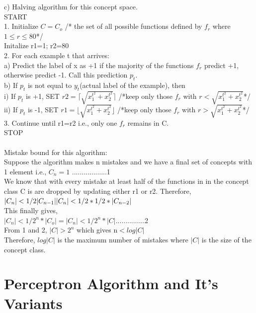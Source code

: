 \documentclass[12pt, fullpage,letterpaper]{article}
\begin{document}
c) Halving algorithm for this concept space.\\
START
\\1. Initialize $C=C_o$ /* the set of all possible functions defined by $f_r$ where $1\leq r\leq80$*/\\
Initalize r1=1; r2=80\\
2. For each  example t that arrives:\\
a) Predict the label of x as +1 if the majority of the functions $f_r$ predict +1, otherwise predict -1. Call this prediction $p_t$.\\
b) If $p_t$ is not equal to $y_t$(actual label of the example), then\\
i) If $p_t$ is +1, SET $r2=\lceil \sqrt{x_1^{t^2} + x_2^{t^2}} \rceil$    /*keep only those $f_r$ with $r<\sqrt{x_1^{t^2} + x_2^{t^2}}$*/\\
ii) If $p_t$ is -1,  SET $r1=\lfloor \sqrt{x_1^{t^2} + x_2^{t^2}} \rfloor$    /*keep only those $f_r$ with $r>\sqrt{x_1^{t^2} + x_2^{t^2}}$*/\\
3. Continue until r1=r2 i.e., only one $f_r$ remains in C.\\
STOP
\\\\
Mistake bound for this algorithm:\\
Suppose the algorithm makes n mistakes and we have a final set of concepts with 1 element i.e., $C_n=1$ ..................1\\
We know that with every mistake at least half of the functions in in the concept class C is are dropped by updating either r1 or r2. Therefore,\\
$|C_n|<1/2 |C_{n-1}| \\
|C_n|<1/2 * 1/2 * |C_{n-2}| $\\
This finally gives,\\
$|C_n|<1/2^n * |C_o| = |C_n|<1/2^n * |C|$...............2\\
From 1 and 2,
$|C|>2^{n}$ which gives n$<log|C|$\\
Therefore, $log|C|$ is the maximum number of mistakes where $|C|$ is the size of the concept class.


\section{Perceptron Algorithm and It's Variants}
\setcounter{subsection}{2}
\end{document}
